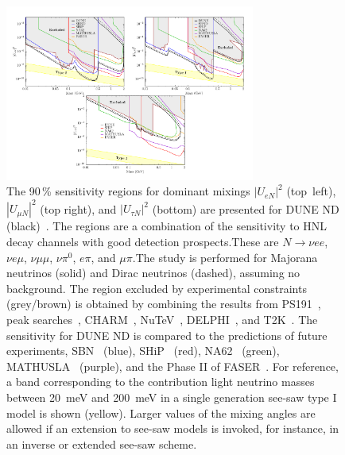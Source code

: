 \begin{figure}[!htb]
	\begin{center}
	  	\includegraphics[width=0.73\textwidth]{graphics/DUNE_BSM_HNL.pdf}
	\end{center}
\caption[The 90\,\%  sensitivity regions for dominant mixings
		$|U_{\alpha N}|^2$]
		{The 90\,\%  sensitivity regions for dominant mixings %
		$|U_{e N}|^2$ (top~left), $|U_{\mu N}|^2$ (top right), and $|U_{\tau N}|^2$ (bottom) are presented for DUNE ND (black)~\cite{Ballett:2019bgd}.
		The regions are a combination of the sensitivity to HNL decay channels with good detection prospects.These are $N\to\nu e e$, $\nu e \mu$, $\nu \mu \mu$, $\nu \pi^0$, $e \pi$, and $\mu \pi$.The study is performed for Majorana neutrinos (solid) and Dirac neutrinos (dashed), %
		assuming no background. The region excluded by experimental constraints (grey/brown) is obtained by combining the results from PS191~\cite{Bernardi:1985ny, Bernardi:1987ek}, %
		peak searches~\cite{Artamonov:2014urb, Britton:1992pg, Britton:1992xv, Aguilar-Arevalo:2017vlf, Aguilar-Arevalo:2019owf}, %
		CHARM~\cite{Vilain:1994vg}, NuTeV~\cite{Vaitaitis:1999wq}, DELPHI~\cite{Abreu:1996pa}, and T2K~\cite{Abe:2019kgx}. The sensitivity for DUNE ND is compared to the predictions of future experiments, SBN~\cite{Ballett:2016opr} (blue), %
		SHiP~\cite{Alekhin:2015byh} (red), NA62~\cite{Drewes:2018gkc} (green), MATHUSLA~\cite{Curtin:2018mvb} (purple), and the Phase II of FASER~\cite{Kling:2018wct}.
		For reference, a band corresponding to the contribution light neutrino masses between 20~meV and 200~meV in a single generation see-saw type I model is shown (yellow).
		Larger values of the mixing angles are allowed if an extension to see-saw models is invoked,
		for instance, in an inverse or extended see-saw scheme.}
\label{fig:sensa_hnl}
\end{figure}

